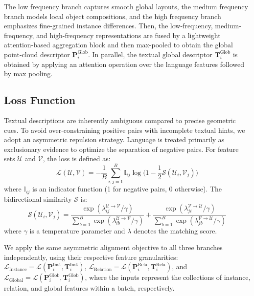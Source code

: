 \documentclass{article}
\begin{document}
The low frequency branch captures smooth global layouts, the medium frequency branch models local object compositions, and the high frequency branch emphasizes fine-grained instance differences. Then, the low-frequency, medium-frequency, and high-frequency representations are fused by a lightweight attention-based aggregation block and then max-pooled to obtain the global point-cloud descriptor $\mathbf{P}^{\mathrm{Glob}}_i$. In parallel, the textual global descriptor $\mathbf{T}^{\mathrm{Glob}}_i$ is obtained by applying an attention operation over the language features followed by max pooling.
\subsection{Loss Function}
Textual descriptions are inherently ambiguous compared to precise geometric cues. To avoid over-constraining positive pairs with incomplete textual hints, we adopt an asymmetric repulsion strategy. Language is treated primarily as exclusionary evidence to optimize the separation of negative pairs. For feature sets $\mathcal{U}$ and $\mathcal{V}$, the loss is defined as:
\begin{equation}
\mathcal{L}(\mathcal{U}, \mathcal{V}) = -\frac{1}{B} \sum_{i,j=1}^B \mathbb{I}_{ij} \log \bigl( 1 - \frac{1}{2}\mathcal{S}(\mathcal{U}_i, \mathcal{V}_j) \bigr)
\label{eq:asym_loss}
\end{equation}
where $\mathbb{I}_{ij}$ is an indicator function (1 for negative pairs, 0 otherwise). The bidirectional similarity $\mathcal{S}$ is:
\begin{equation}
\mathcal{S}(\mathcal{U}_i, \mathcal{V}_j) = \frac{\exp(\lambda_{ij}^{\mathcal{U} \to \mathcal{V}}/\gamma)}{\sum_{b=1}^B \exp(\lambda_{ib}^{\mathcal{U} \to \mathcal{V}}/\gamma)} + \frac{\exp(\lambda_{ji}^{\mathcal{V} \to \mathcal{U}}/\gamma)}{\sum_{b=1}^B \exp(\lambda_{jb}^{\mathcal{V} \to \mathcal{U}}/\gamma)}
\label{eq:similarity}
\end{equation}
where $\gamma$ is a temperature parameter and $\lambda$ denotes the matching score. 

We apply the same asymmetric alignment objective to all three branches independently, using their respective feature granularities: $\mathcal{L}_{\mathrm{Instance}} = \mathcal{L}(\mathbf{P}^{\mathrm{Inst}}_i, \mathbf{T}^{\mathrm{Inst}}_i)$, $\mathcal{L}_{\mathrm{Relation}} = \mathcal{L}(\mathbf{P}^{\mathrm{Rela}}_i, \mathbf{T}^{\mathrm{Rela}}_i)$, and $\mathcal{L}_{\mathrm{Global}} = \mathcal{L}(\mathbf{P}^{\mathrm{Glob}}_i, \mathbf{T}^{\mathrm{Glob}}_i)$, where the inputs represent the collections of instance, relation, and global features within a batch, respectively.
\end{document}
